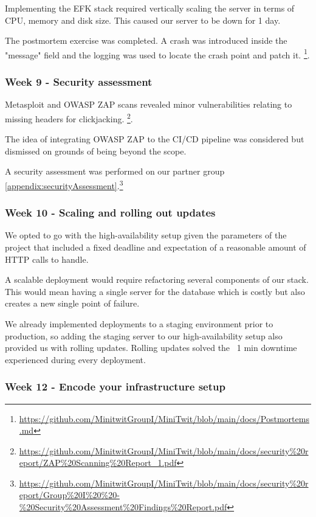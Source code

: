 \documentclass{article}
\begin{document}
Implementing the EFK stack required vertically scaling the server in terms of CPU, memory and disk size. This caused our server to be down for 1 day. 

The postmortem exercise was completed. A crash was introduced inside the "message" field and the logging was used to locate the crash point and patch it. \footnote{\url{https://github.com/MinitwitGroupI/MiniTwit/blob/main/docs/Postmortems.md}}. 

\subsubsection{Week 9 - Security assessment}

Metasploit and OWASP ZAP scans revealed minor vulnerabilities relating to missing headers for clickjacking.
\footnote{\url{https://github.com/MinitwitGroupI/MiniTwit/blob/main/docs/security\%20report/ZAP\%20Scanning\%20Report_1.pdf}}. 

The idea of integrating OWASP ZAP to the CI/CD pipeline was considered but dismissed on grounds of being beyond the scope.

A security assessment was performed on our partner group \ref{appendix:securityAssessment}.\footnote{\url{https://github.com/MinitwitGroupI/MiniTwit/blob/main/docs/security\%20report/Group\%20I\%20\%20-\%20Security\%20Assessment\%20Findings\%20Report.pdf}}

\subsubsection{Week 10 - Scaling and rolling out updates }

We opted to go with the high-availability setup given the parameters of the project that included a fixed deadline and expectation of a reasonable amount of HTTP calls to handle. 

A scalable deployment would require refactoring several components of our stack. This would mean having a single server for the database which is costly but also creates a new single point of failure. 

We already implemented deployments to a staging environment prior to production, so adding the staging server to our high-availability setup also provided us with rolling updates. Rolling updates solved the ~1 min downtime experienced during every deployment.  

\subsubsection{Week 12 - Encode your infrastructure setup }
\end{document}
